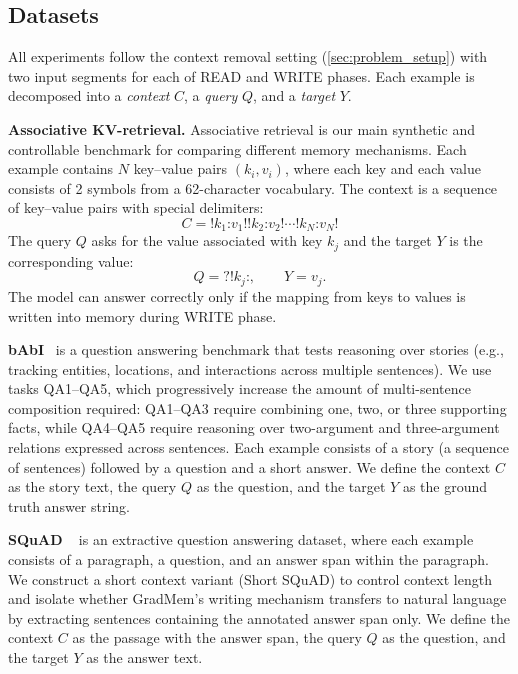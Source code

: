 \documentclass{article}
\theoremstyle{plain}
\theoremstyle{definition}
\theoremstyle{remark}
\begin{document}
{\subsection{Datasets}
\label{sec:datasets}
All experiments follow the context removal setting (\cref{sec:problem_setup}) with two input segments for each of READ and WRITE phases.
Each example is decomposed into a \emph{context} $C$, a \emph{query} $Q$, and a \emph{target} $Y$.

\textbf{Associative KV-retrieval.}
Associative retrieval is our main synthetic and controllable benchmark for comparing different memory mechanisms.
Each example contains $N$ key--value pairs $(k_i, v_i)$, where each key and each value consists of 2 symbols from a 62-character vocabulary. The context is a sequence of key--value pairs with special delimiters:
\[
C = \texttt{!}k_1\texttt{:}v_1\texttt{!!}k_2\texttt{:}v_2\texttt{!}\cdots\texttt{!}k_N\texttt{:}v_N\texttt{!}
\]
The query $Q$ asks for the value associated with key $k_j$ and the target $Y$ is the corresponding value:
\[
Q = \texttt{?!}k_j\texttt{:}, \qquad Y = v_j.
\]
The model can answer correctly only if the mapping from keys to values is written into memory during WRITE phase. 

\textbf{bAbI}~\citep{WestonBCM15_babi}
is a question answering benchmark that tests reasoning over stories (e.g., tracking entities, locations, and interactions across multiple sentences).
We use tasks QA1--QA5, which progressively increase the amount of multi-sentence composition required: QA1--QA3 require combining one, two, or three supporting facts, while QA4--QA5 require reasoning over two-argument and three-argument relations expressed across sentences.
Each example consists of a story (a sequence of sentences) followed by a question and a short answer.
We define the context $C$ as the story text, the query $Q$ as the question, and the target $Y$ as the ground truth answer string.


\textbf{SQuAD}
~\citep{rajpurkar2016squad} is an extractive question answering dataset, where each example consists of a paragraph, a question, and an answer span within the paragraph.
We construct a short context variant (Short SQuAD) to control context length and isolate whether GradMem's writing mechanism transfers to natural language by extracting sentences containing the annotated answer span only.
We define the context $C$ as the passage with the answer span, the query $Q$ as the question, and the target $Y$ as the answer text.%

}
\end{document}
